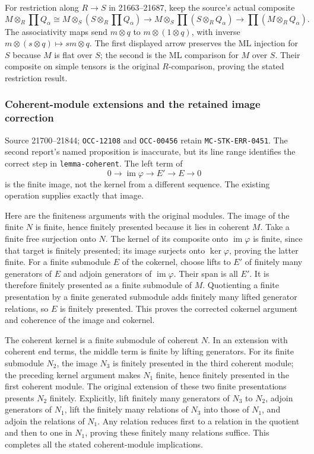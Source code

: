 For restriction along \(R\to S\) in 21663--21687, keep the source's actual composite \[
M\otimes_R\prod Q_\alpha
\cong M\otimes_S(S\otimes_R\prod Q_\alpha)
\longrightarrow M\otimes_S\prod(S\otimes_RQ_\alpha)
\longrightarrow\prod(M\otimes_RQ_\alpha).
\] The associativity maps send \(m\otimes q\) to \(m\otimes(1\otimes q)\), with inverse \(m\otimes(s\otimes q)\mapsto sm\otimes q\). The first displayed arrow preserves the ML injection for \(S\) because \(M\) is flat over \(S\); the second is the ML comparison for \(M\) over \(S\). Their composite on simple tensors is the original \(R\)-comparison, proving the stated restriction result.

\subsubsection{Coherent-module extensions and the retained image correction}\label{coherent-module-extensions-and-the-retained-image-correction}

Source 21700--21844; \texttt{OCC-12108} and \texttt{OCC-00456} retain \texttt{MC-STK-ERR-0451}. The second report's named proposition is inaccurate, but its line range identifies the correct step in \texttt{lemma-coherent}. The left term of \[
0\longrightarrow\operatorname{im}\varphi\longrightarrow E'\longrightarrow E\longrightarrow0
\] is the finite image, not the kernel from a different sequence. The existing operation supplies exactly that image.

Here are the finiteness arguments with the original modules. The image of the finite \(N\) is finite, hence finitely presented because it lies in coherent \(M\). Take a finite free surjection onto \(N\). The kernel of its composite onto \(\operatorname{im}\varphi\) is finite, since that target is finitely presented; its image surjects onto \(\ker\varphi\), proving the latter finite. For a finite submodule \(E\) of the cokernel, choose lifts to \(E'\) of finitely many generators of \(E\) and adjoin generators of \(\operatorname{im}\varphi\). Their span is all \(E'\). It is therefore finitely presented as a finite submodule of \(M\). Quotienting a finite presentation by a finite generated submodule adds finitely many lifted generator relations, so \(E\) is finitely presented. This proves the corrected cokernel argument and coherence of the image and cokernel.

The coherent kernel is a finite submodule of coherent \(N\). In an extension with coherent end terms, the middle term is finite by lifting generators. For its finite submodule \(N_2\), the image \(N_3\) is finitely presented in the third coherent module; the preceding kernel argument makes \(N_1\) finite, hence finitely presented in the first coherent module. The original extension of these two finite presentations presents \(N_2\) finitely. Explicitly, lift finitely many generators of \(N_3\) to \(N_2\), adjoin generators of \(N_1\), lift the finitely many relations of \(N_3\) into those of \(N_1\), and adjoin the relations of \(N_1\). Any relation reduces first to a relation in the quotient and then to one in \(N_1\), proving these finitely many relations suffice. This completes all the stated coherent-module implications.

